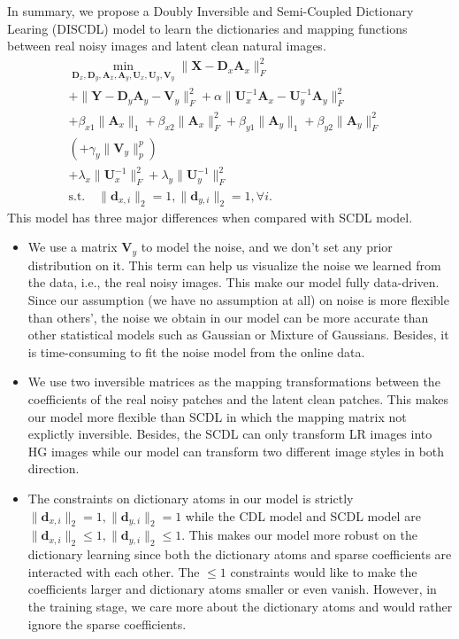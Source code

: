 \documentclass[10pt,twocolumn,letterpaper]{article}
\begin{document}
In summary, we propose a Doubly Inversible and Semi-Coupled Dictionary Learing (DISCDL) model to learn the dictionaries and mapping functions between real noisy images and latent clean natural images. 
\begin{equation}
\begin{split}
\min_{\mathbf{D}_{x},\mathbf{D}_{y},\mathbf{A}_{x},\mathbf{A}_{y},\mathbf{U}_{x},\mathbf{U}_{y},\mathbf{V}_{y}}
\|\mathbf{X}-\mathbf{D}_{x}\mathbf{A}_{x}\|_{F}^{2}&
\\
+
\|\mathbf{Y}-\mathbf{D}_{y}\mathbf{A}_{y}-\mathbf{V}_{y}\|_{F}^{2}
+
\alpha
\|\mathbf{U}_{x}^{-1}\mathbf{A}_{x}-\mathbf{U}_{y}^{-1}\mathbf{A}_{y}\|_{F}^{2}&
\\
+
\beta_{x1}\|\mathbf{A}_{x}\|_{1}
+
\beta_{x2}\|\mathbf{A}_{x}\|_{F}^{2}
+
\beta_{y1}\|\mathbf{A}_{y}\|_{1}
+
\beta_{y2}\|\mathbf{A}_{y}\|_{F}^{2}
&
\\
(+
\gamma_{y}\|\mathbf{V}_{y}\|_{p}^{p})
&
\\
+
\lambda_{x}\|\mathbf{U}_{x}^{-1}\|_{F}^{2}
+
\lambda_{y}\|\mathbf{U}_{y}^{-1}\|_{F}^{2}
\\
\text{s.t.}\quad \|\mathbf{d}_{x,i}\|_{2}=1, \|\mathbf{d}_{y,i}\|_{2}=1, \forall{i}.
\end{split}
\end{equation}
This model has three major differences when compared with SCDL model.
\begin{itemize}
\item We use a matrix $\mathbf{V}_{y}$ to model the noise, and we don't set any prior distribution on it. This term can help us visualize the noise we learned from the data, i.e., the real noisy images. This make our model fully data-driven. Since our assumption (we have no assumption at all) on noise is more flexible than others', the noise we obtain in our model can be more accurate than other statistical models such as Gaussian or Mixture of Gaussians. Besides, it is time-consuming to fit the noise model from the online data. 
\item We use two inversible matrices as the mapping transformations between the coefficients of the real noisy patches and the latent clean patches. This makes our model more flexible than SCDL in which the mapping matrix not explictly inversible. Besides, the SCDL can only transform LR images into HG images while our model can transform two different image styles in both direction.
\item The constraints on dictionary atoms in our model is strictly $\|\mathbf{d}_{x,i}\|_{2}=1, \|\mathbf{d}_{y,i}\|_{2}=1$ while the CDL model and SCDL model are $\|\mathbf{d}_{x,i}\|_{2}\le1, \|\mathbf{d}_{y,i}\|_{2}\le1$. This makes our model more robust on the dictionary learning since both the dictionary atoms and sparse coefficients are interacted with each other. The $\le1$ constraints would like to make the coefficients larger and dictionary atoms smaller or even vanish. However, in the training stage, we care more about the dictionary atoms and would rather ignore the sparse coefficients.  
\end{itemize}
\end{document}
